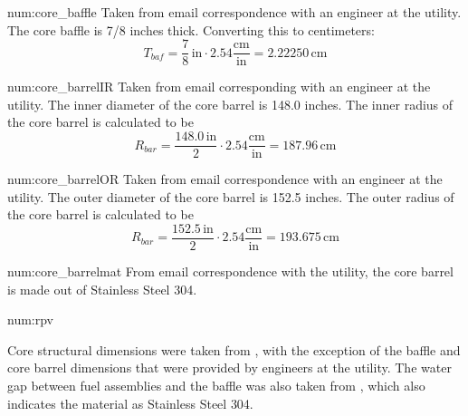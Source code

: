 \begin{numitem}{num:core_baffle}
  Taken from email correspondence with an engineer at the utility. The core baffle is 7/8 inches thick. Converting this to centimeters:
\[
    T_{baf} = \frac{7}{8}\,\mathrm{in} \cdot 2.54 \mathrm{\frac{cm}{in}} = 2.22250\,\mathrm{cm}
\]
\end{numitem}

\begin{numitem}{num:core_barrelIR}
  Taken from email corresponding with an engineer at the utility. The inner diameter of the core barrel is 148.0 inches. The inner radius of the core barrel is calculated to be
\[
    R_{bar} = \frac{148.0\,\mathrm{in}}{2} \cdot 2.54 \mathrm{\frac{cm}{in}} = 187.96\,\mathrm{cm}
\]
\end{numitem}

\begin{numitem}{num:core_barrelOR}
  Taken from email correspondence with an engineer at the utility. The outer diameter of the core barrel is 152.5 inches. The outer radius of the core barrel is calculated to be
\[
    R_{bar} = \frac{152.5\,\mathrm{in}}{2} \cdot 2.54 \mathrm{\frac{cm}{in}} = 193.675\,\mathrm{cm}
\]
\end{numitem}

\begin{numitem}{num:core_barrelmat}
    From email correspondence with the utility, the core barrel is made out of Stainless Steel 304.
\end{numitem}

\begin{numitem}{num:rpv}
    
    Core structural dimensions were taken from \cite{ml033530020}, with the
    exception of the baffle and core barrel dimensions that were provided by
    engineers at the utility. The water gap between fuel assemblies and the
    baffle was also taken from \cite{ml033530020}, which also indicates the
    material as Stainless Steel 304.
    
\end{numitem}

